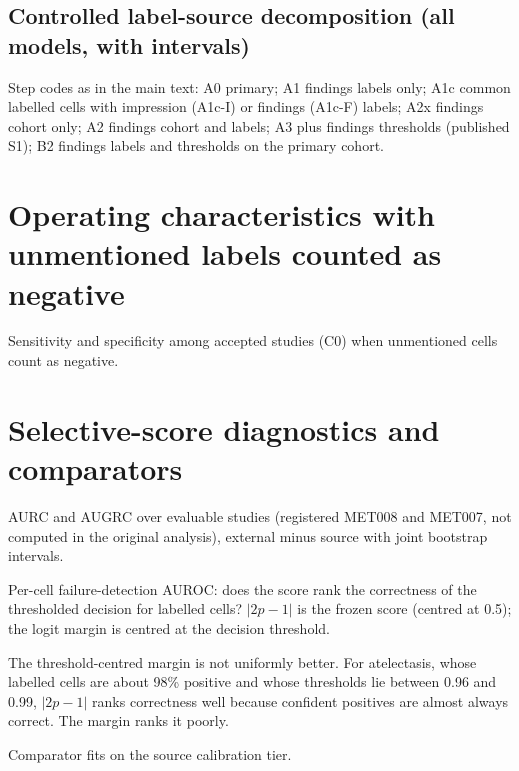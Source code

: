 \documentclass[10pt,a4paper]{article}
\begin{document}
\begin{landscape}
\section{Controlled label-source decomposition (all models, with intervals)}
Step codes as in the main text: A0 primary; A1 findings labels only; A1c
common labelled cells with impression (A1c-I) or findings (A1c-F) labels; A2x findings cohort
only; A2 findings cohort and labels; A3 plus findings thresholds (published
S1); B2 findings labels and thresholds on the primary cohort.
\footnotesize

\normalsize
\end{landscape}

\section{Operating characteristics with unmentioned labels counted as negative}
\begin{table}[h]\centering\small
\caption{Sensitivity and specificity among accepted studies (C0) when unmentioned
cells count as negative.}

\end{table}

\section{Selective-score diagnostics and comparators}
\begin{table}[h]\centering\small
\caption{AURC and AUGRC over evaluable studies (registered MET008 and MET007,
not computed in the original analysis), external minus source with joint
bootstrap intervals.}
\begin{adjustbox}{max width=\linewidth}\end{adjustbox}
\end{table}
\begin{table}[h]\centering\small
\caption{Per-cell failure-detection AUROC: does the score rank the correctness
of the thresholded decision for labelled cells? $|2p-1|$ is the frozen score
(centred at 0.5); the logit margin is centred at the decision threshold.}
\begin{adjustbox}{max width=\linewidth}\end{adjustbox}
\end{table}
The threshold-centred margin is not uniformly better. For atelectasis, whose
labelled cells are about 98\% positive and whose thresholds lie between 0.96
and 0.99, $|2p-1|$ ranks correctness well because confident positives are
almost always correct. The margin ranks it poorly.
\begin{table}[h]\centering\small
\caption{Comparator fits on the source calibration tier.}
\begin{adjustbox}{max width=\linewidth}\end{adjustbox}
\end{table}
\end{document}

